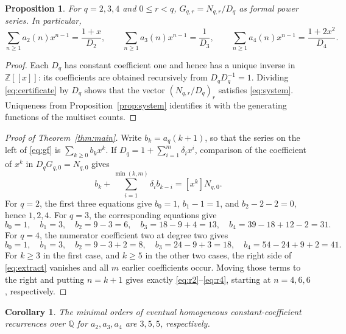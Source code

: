 \documentclass[11pt,a4paper]{article}
\newtheorem{proposition}[theorem]{Proposition}
\newtheorem{corollary}[theorem]{Corollary}
\theoremstyle{remark}
\newcommand{\Z}{\mathbb Z}
\newcommand{\Q}{\mathbb Q}
\begin{document}
\begin{proposition}\label{prop:gf}
For $q=2,3,4$ and $0\le r<q$, $G_{q,r}=N_{q,r}/D_q$ as formal power
series. In particular,
\begin{equation}\label{eq:gf}
 \sum_{n\ge1}a_2(n)x^{n-1}=\frac{1+x}{D_2},\qquad
 \sum_{n\ge1}a_3(n)x^{n-1}=\frac1{D_3},\qquad
 \sum_{n\ge1}a_4(n)x^{n-1}=\frac{1+2x^2}{D_4}.
\end{equation}
\end{proposition}

\begin{proof}
Each $D_q$ has constant coefficient one and hence has a unique inverse in
$\Z[[x]]$: its coefficients are obtained recursively from $D_qD_q^{-1}=1$.
Dividing \eqref{eq:certificate} by $D_q$ shows that the vector
$(N_{q,r}/D_q)_r$ satisfies \eqref{eq:system}. Uniqueness from
Proposition~\ref{prop:system} identifies it with the generating functions of the
multiset counts.
\end{proof}

\begin{proof}[Proof of Theorem~\ref{thm:main}]
Write $b_k=a_q(k+1)$, so that the series on the left of \eqref{eq:gf} is
$\sum_{k\ge0}b_kx^k$. If $D_q=1+\sum_{i=1}^m\delta_i x^i$, comparison
of the coefficient of $x^k$ in $D_qG_{q,0}=N_{q,0}$ gives
\begin{equation}\label{eq:extract}
 b_k+\sum_{i=1}^{\min(k,m)}\delta_i b_{k-i}=[x^k]N_{q,0}.
\end{equation}
For $q=2$, the first three equations give $b_0=1$, $b_1-1=1$, and
$b_2-2-2=0$, hence $1,2,4$. For $q=3$, the corresponding equations give
\[
 b_0=1,\quad b_1=3,\quad b_2=9-3=6,\quad
 b_3=18-9+4=13,\quad b_4=39-18+12-2=31.
\]
For $q=4$, the numerator coefficient two at degree two gives
\[
 b_0=1,\quad b_1=3,\quad b_2=9-3+2=8,\quad
 b_3=24-9+3=18,\quad b_4=54-24+9+2=41.
\]
For $k\ge3$ in the first case, and $k\ge5$ in the other two cases, the
right side of \eqref{eq:extract} vanishes and all $m$ earlier coefficients
occur. Moving those terms to the right and putting $n=k+1$ gives exactly
\eqref{eq:r2}--\eqref{eq:r4}, starting at $n=4,6,6$, respectively.
\end{proof}

\begin{corollary}\label{cor:minimal}
The minimal orders of eventual homogeneous constant-coefficient recurrences
over $\Q$ for $a_2,a_3,a_4$ are $3,5,5$, respectively.
\end{corollary}
\end{document}
